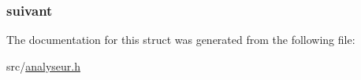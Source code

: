 \subsubsection[{\texorpdfstring{suivant}{suivant}}]{ suivant}\hypertarget{structmaillon_a228be6326ce187047bca162b0f8db8c3}{}\label{structmaillon_a228be6326ce187047bca162b0f8db8c3}


The documentation for this struct was generated from the following file\+:\begin{DoxyCompactItemize}
\item 
src/\hyperlink{analyseur_8h}{analyseur.\+h}\end{DoxyCompactItemize}
